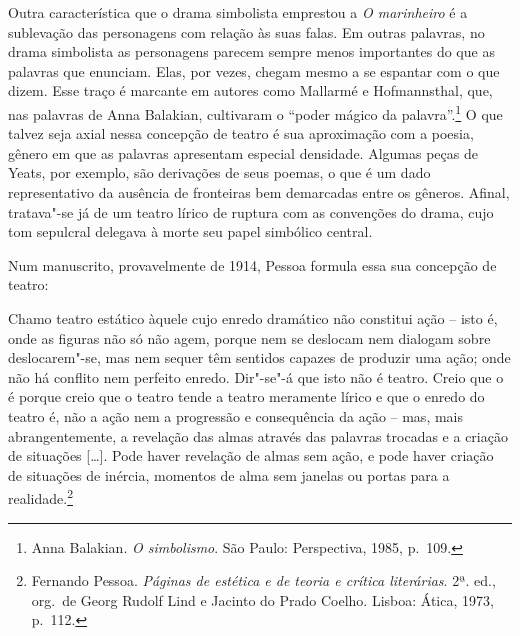 Outra característica que o drama simbolista emprestou a \textit{O
marinheiro} é a sublevação das personagens com relação às suas
falas. Em outras palavras, no drama simbolista as personagens 
parecem sempre menos importantes do que as palavras que enunciam. 
Elas, por vezes, chegam mesmo a se espantar com o que dizem. 
Esse traço é marcante em autores como Mallarmé e Hofmannsthal, 
que, nas palavras de Anna Balakian, cultivaram o “poder mágico 
da palavra”.\footnote{ Anna Balakian.
\textit{O simbolismo}. São Paulo: 
Perspectiva, 1985, p.~109.} O que talvez seja axial 
nessa concepção de teatro é sua aproximação com a
poesia, gênero em que as palavras apresentam especial densidade.
Algumas peças de Yeats, por exemplo, são derivações de seus 
poemas, o que é um dado representativo da ausência de 
fronteiras bem demarcadas entre os gêneros.
Afinal, tratava"-se já de um teatro lírico de ruptura
com as convenções do drama, cujo tom sepulcral delegava
à morte seu papel simbólico central. 

Num manuscrito, provavelmente de 1914, Pessoa formula
essa sua concepção de teatro:

\begin{hedraquote}
Chamo teatro estático àquele cujo enredo 
dramático não constitui ação --
isto é, onde as figuras não só não
agem, porque nem se deslocam nem
dialogam sobre deslocarem"-se, mas
nem sequer têm sentidos capazes de
produzir uma ação; onde não há conflito
nem perfeito enredo. Dir"-se"-á
que isto não é teatro. Creio que o é
porque creio que o teatro tende a
teatro meramente lírico e que o enredo
do teatro é, não a ação nem a
progressão e consequência da ação --
mas, mais abrangentemente, a
revelação das almas através das 
palavras trocadas e a criação de
situações [\ldots{}]. Pode haver revelação
de almas sem ação, e pode haver
criação de situações de inércia, momentos 
de alma sem janelas ou portas
para a realidade.\footnote{ Fernando Pessoa. \textit{Páginas de estética e de teoria e crítica
literárias}. 2ª. ed., org.~de Georg Rudolf Lind e Jacinto do Prado
Coelho. Lisboa: Ática, 1973, p.~112.}
\end{hedraquote}

